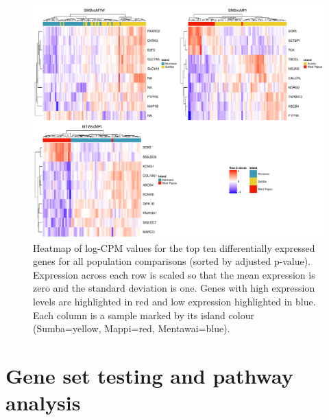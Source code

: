 \documentclass[12pt,a4paper,titlepage,twoside,openright]{book}
\begin{document}
\begin{mainmatter}
\begin{figure}[htb!]
\centering
\includegraphics[width=\textwidth,height=\textheight,keepaspectratio]{HeatmapAllPops_dupCor.pdf}
\caption{Heatmap of log-CPM values for the top ten differentially expressed genes for all population comparisons (sorted by adjusted p-value). Expression across each row is scaled so that the mean expression is zero and the standard deviation is one. Genes with high expression levels are highlighted in red and low expression highlighted in blue. Each column is a sample marked by its island colour (Sumba=yellow, Mappi=red, Mentawai=blue).}
\label{fig:Heatmap Top Genes}
\end{figure}



\section{Gene set testing and pathway analysis}


\end{mainmatter}
\end{document}
